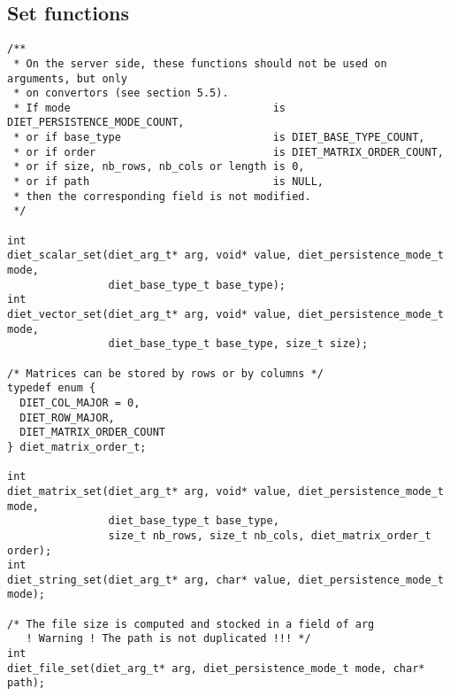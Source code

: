 \subsection{Set functions}


\label{sec:setfun}
{\footnotesize
\begin{verbatim}
/**
 * On the server side, these functions should not be used on arguments, but only
 * on convertors (see section 5.5).
 * If mode                                is DIET_PERSISTENCE_MODE_COUNT, 
 * or if base_type                        is DIET_BASE_TYPE_COUNT,
 * or if order                            is DIET_MATRIX_ORDER_COUNT,
 * or if size, nb_rows, nb_cols or length is 0,
 * or if path                             is NULL,
 * then the corresponding field is not modified.
 */

int
diet_scalar_set(diet_arg_t* arg, void* value, diet_persistence_mode_t mode,
                diet_base_type_t base_type);
int
diet_vector_set(diet_arg_t* arg, void* value, diet_persistence_mode_t mode,
                diet_base_type_t base_type, size_t size);

/* Matrices can be stored by rows or by columns */
typedef enum {
  DIET_COL_MAJOR = 0,
  DIET_ROW_MAJOR,
  DIET_MATRIX_ORDER_COUNT
} diet_matrix_order_t;

int
diet_matrix_set(diet_arg_t* arg, void* value, diet_persistence_mode_t mode,
                diet_base_type_t base_type,
                size_t nb_rows, size_t nb_cols, diet_matrix_order_t order);
int
diet_string_set(diet_arg_t* arg, char* value, diet_persistence_mode_t mode);

/* The file size is computed and stocked in a field of arg
   ! Warning ! The path is not duplicated !!! */
int
diet_file_set(diet_arg_t* arg, diet_persistence_mode_t mode, char* path);
\end{verbatim}
}


